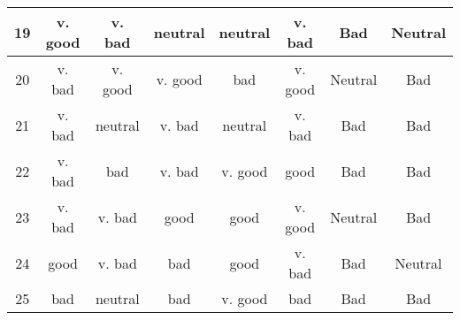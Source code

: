 \begin{table}
\begin{tabular}{cccccc||c|c}
19&v. good &  v. bad & neutral & neutral &  v. bad & Bad & Neutral \\\hline
20& v. bad & v. good & v. good &     bad & v. good & Neutral & Bad \\\hline
21& v. bad & neutral &  v. bad & neutral &  v. bad & Bad & Bad \\\hline
22& v. bad &     bad &  v. bad & v. good &    good & Bad & Bad \\\hline
23& v. bad &  v. bad &    good &    good & v. good & Neutral & Bad \\\hline
24&   good &  v. bad &     bad &    good &  v. bad & Bad & Neutral \\\hline
25&    bad & neutral &     bad & v. good &     bad & Bad & Bad \\\hline
\end{tabular}
\end{table}